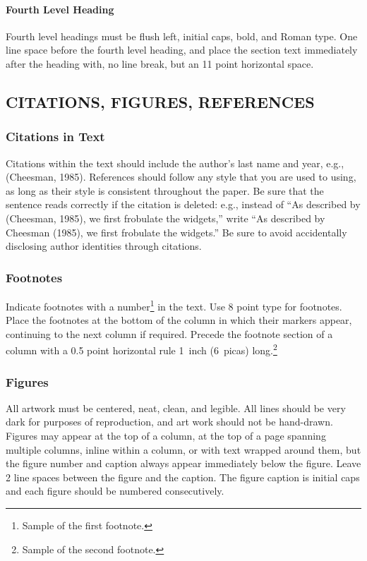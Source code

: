 \documentclass[twoside]{article}
\begin{document}
\paragraph{Fourth Level Heading}

Fourth level headings must be flush left, initial caps, bold, and
Roman type.  One line space before the fourth level heading, and
place the section text immediately after the heading with, no line
break, but an 11 point horizontal space.

\subsection{CITATIONS, FIGURES, REFERENCES}


\subsubsection{Citations in Text}

Citations within the text should include the author's last name and
year, e.g., (Cheesman, 1985). References should follow any style that
you are used to using, as long as their style is consistent throughout
the paper.  Be sure that the sentence reads correctly if the citation
is deleted: e.g., instead of ``As described by (Cheesman, 1985), we
first frobulate the widgets,'' write ``As described by Cheesman
(1985), we first frobulate the widgets.''  Be sure to avoid
accidentally disclosing author identities through citations.

\subsubsection{Footnotes}

Indicate footnotes with a number\footnote{Sample of the first
  footnote.} in the text. Use 8 point type for footnotes. Place the
footnotes at the bottom of the column in which their markers appear,
continuing to the next column if required. Precede the footnote
section of a column with a 0.5 point horizontal rule 1~inch (6~picas)
long.\footnote{Sample of the second footnote.}

\subsubsection{Figures}

All artwork must be centered, neat, clean, and legible.  All lines
should be very dark for purposes of reproduction, and art work should
not be hand-drawn.  Figures may appear at the top of a column, at the
top of a page spanning multiple columns, inline within a column, or
with text wrapped around them, but the figure number and caption
always appear immediately below the figure.  Leave 2 line spaces
between the figure and the caption. The figure caption is initial caps
and each figure should be numbered consecutively.
\end{document}
